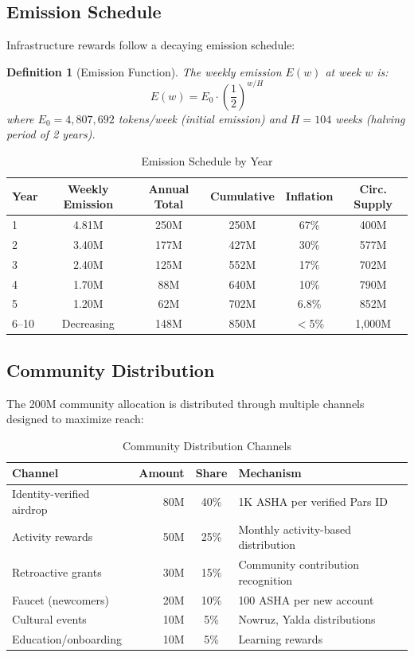 \documentclass[11pt,a4paper]{article}
\newtheorem{definition}{Definition}
\begin{document}
\subsection{Emission Schedule}

Infrastructure rewards follow a decaying emission schedule:

\begin{definition}[Emission Function]
The weekly emission $E(w)$ at week $w$ is:
\begin{equation}
    E(w) = E_0 \cdot \left(\frac{1}{2}\right)^{w / H}
\end{equation}
where $E_0 = 4{,}807{,}692$ tokens/week (initial emission) and $H = 104$ weeks (halving period of 2 years).
\end{definition}

\begin{table}[H]
\centering
\caption{Emission Schedule by Year}
\label{tab:emission}
\begin{tabular}{lccccc}
\toprule
\textbf{Year} & \textbf{Weekly Emission} & \textbf{Annual Total} & \textbf{Cumulative} & \textbf{Inflation} & \textbf{Circ. Supply} \\
\midrule
1 & 4.81M & 250M & 250M & 67\% & 400M \\
2 & 3.40M & 177M & 427M & 30\% & 577M \\
3 & 2.40M & 125M & 552M & 17\% & 702M \\
4 & 1.70M & 88M & 640M & 10\% & 790M \\
5 & 1.20M & 62M & 702M & 6.8\% & 852M \\
6--10 & Decreasing & 148M & 850M & $<$5\% & 1{,}000M \\
\bottomrule
\end{tabular}
\end{table}

\subsection{Community Distribution}

The 200M community allocation is distributed through multiple channels designed to maximize reach:

\begin{table}[H]
\centering
\caption{Community Distribution Channels}
\label{tab:community-dist}
\begin{tabular}{lrcl}
\toprule
\textbf{Channel} & \textbf{Amount} & \textbf{Share} & \textbf{Mechanism} \\
\midrule
Identity-verified airdrop & 80M & 40\% & 1K ASHA per verified Pars ID \\
Activity rewards & 50M & 25\% & Monthly activity-based distribution \\
Retroactive grants & 30M & 15\% & Community contribution recognition \\
Faucet (newcomers) & 20M & 10\% & 100 ASHA per new account \\
Cultural events & 10M & 5\% & Nowruz, Yalda distributions \\
Education/onboarding & 10M & 5\% & Learning rewards \\
\bottomrule
\end{tabular}
\end{table}
\end{document}
